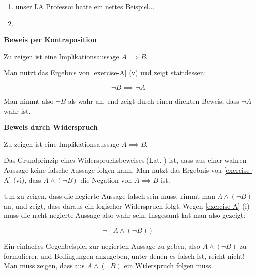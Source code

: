 \begin{example}
    \begin{enumerate}
        \item unser LA Professor hatte ein nettes Beispiel...    
        \item 
    \end{enumerate}
\end{example}

\begin{shadedbox}
    \textbf{Beweis per Kontraposition}

    Zu zeigen ist eine Implikationsaussage $A \implies B$.

    Man nutzt das Ergebnis von \ref{exercise-A} (v) und zeigt stattdessen:

    $$\neg B \implies \neg A$$

    Man nimmt also $\neg B$ als wahr an, und zeigt durch einen direkten Beweis, dass $\neg A$ wahr ist.
\end{shadedbox}

\begin{example}
    
\end{example}

\begin{shadedbox}
    \textbf{Beweis durch Widerspruch}

    Zu zeigen ist eine Implikationsaussage $A \implies B$.

    Das Grundprinzip eines Widerspruchsbeweises (Lat. ) ist, dass aus einer wahren Aussage keine falsche Aussage folgen kann. Man nutzt das Ergebnis von \ref{exercise-A} (vi), dass $A \land (\neg B)$ die Negation von $A \implies B$ ist.
    
    Um zu zeigen, dass die negierte Aussage falsch sein muss, nimmt man $A \land (\neg B)$ an, und zeigt, dass daraus ein logischer Widerspruch folgt. Wegen \ref{exercise-A} (i) muss die nicht-negierte Aussage also wahr sein. Insgesamt hat man also gezeigt:

    $$\neg (A \land (\neg B))$$
\end{shadedbox}

\begin{remark}
    Ein einfaches Gegenbeispiel zur negierten Aussage zu geben, also $A \land (\neg B)$ zu formulieren und Bedingungen anzugeben, unter denen es falsch ist, reicht nicht! Man muss zeigen, dass aus $A \land (\neg B)$ ein Widerspruch folgen \uline{muss}.
\end{remark}

